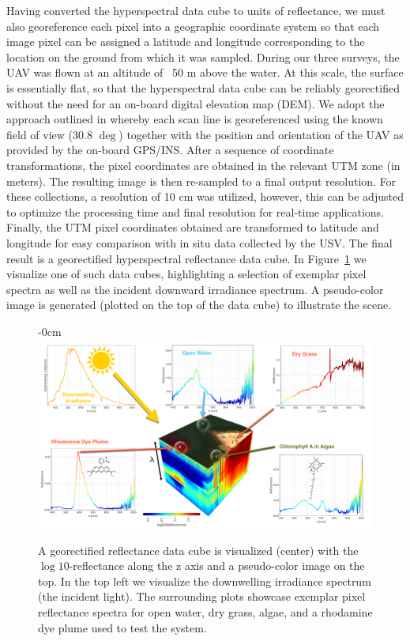 \documentclass[remotesensing,article,submit,pdftex,moreauthors]{Definitions/mdpi}
\begin{document}
Having converted the hyperspectral data cube to units of reflectance, we must also georeference each pixel into a geographic coordinate system so that each image pixel can be assigned a latitude and longitude corresponding to the location on the ground from which it was sampled. During our three surveys, the UAV was flown at an altitude of ~50 m above the water. At this scale, the surface is essentially flat, so that the hyperspectral data cube can be reliably georectified without the need for an on-board digital elevation map (DEM). We adopt the approach outlined in \cite{GeorectificationMuller, GeorectificationBaumker, GeorectificationMostafa} whereby each scan line is georeferenced using the known field of view (30.8 $\deg$) together with the position and orientation of the UAV as provided by the on-board GPS/INS. After a sequence of coordinate transformations, the pixel coordinates are obtained in the relevant UTM zone (in meters). The resulting image is then re-sampled to a final output resolution. For these collections, a resolution of 10 cm was utilized, however, this can be adjusted to optimize the processing time and final resolution for real-time applications. Finally, the UTM pixel coordinates obtained are transformed to latitude and longitude for easy comparison with in situ data collected by the USV. The final result is a georectified hyperspectral reflectance data cube. In Figure~\ref{fig:hsi-infographic} we visualize one of such data cubes, highlighting a selection of exemplar pixel spectra as well as the incident downward irradiance spectrum. A pseudo-color image is generated (plotted on the top of the data cube) to illustrate the scene.

\begin{figure}[H]
\begin{adjustwidth}{-\extralength}{0cm}
\centering
\includegraphics[width=15.5cm]{paper/figures/materials-and-methods/HyperSpectralInfoGraphic.pdf}
\end{adjustwidth}
\caption{A georectified reflectance data cube is visualized (center) with the $\log10$-reflectance along the z axis and a pseudo-color image on the top. In the top left we visualize the downwelling irradiance spectrum (the incident light). The surrounding plots showcase exemplar pixel reflectance spectra for open water, dry grass, algae, and a rhodamine dye plume used to test the system.\label{fig:hsi-infographic}}
\end{figure}  
\end{document}
